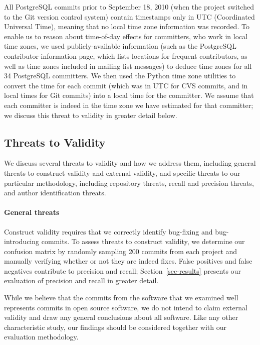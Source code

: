 All PostgreSQL commits prior to September 18, 2010 (when the project switched to
the Git version control system) contain timestamps only in UTC (Coordinated
Universal Time), meaning that no local time zone information was recorded. To
enable us to reason about time-of-day effects for committers, who work in local
time zones, we used publicly-available information (such as the PostgreSQL
contributor-information page, which lists locations for frequent contributors,
as well as time zones included in mailing list messages) to deduce time zones
for all 34 PostgreSQL committers. We then used the Python time zone utilities to
convert the time for each commit (which was in UTC for CVS commits, and in local
times for Git commits) into a local time for the committer. We assume that each
committer is indeed in the time zone we have estimated for that committer; we
discuss this threat to validity in greater detail below.

\subsection{Threats to Validity}
\label{sec-validity}

We discuss several threats to validity and how we address them, including
general threats to construct validity and external validity, and specific
threats to our particular methodology, including repository threats, recall and
precision threats, and author identification threats.

\paragraph{General threats}

Construct validity requires that we correctly identify bug-fixing and
bug-introducing commits. To assess threats to construct validity, we determine
our confusion matrix by randomly sampling 200 commits from each project and
manually verifying whether or not they are indeed fixes. False positives and
false negatives contribute to precision and recall; Section~\ref{sec-results}
presents our evaluation of precision and recall in greater detail.

While we believe that the commits from the software that we examined well
represents commits in open source software, we do not intend to claim external
validity and draw any general conclusions about all software. Like any other
characteristic study, our findings should be considered together with our
evaluation methodology.

